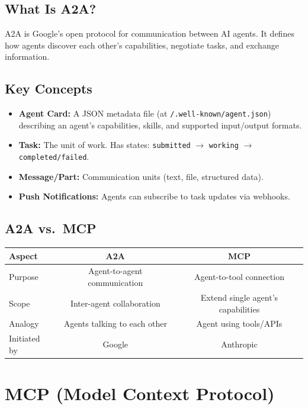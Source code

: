\documentclass[11pt,a4paper]{article}
\begin{document}
\subsection{What Is A2A?}
A2A is Google's open protocol for communication between AI agents. It defines how agents discover each other's capabilities, negotiate tasks, and exchange information.

\subsection{Key Concepts}
\begin{itemize}[nosep]
  \item \textbf{Agent Card:} A JSON metadata file (at \texttt{/.well-known/agent.json}) describing an agent's capabilities, skills, and supported input/output formats.
  \item \textbf{Task:} The unit of work. Has states: \texttt{submitted} $\to$ \texttt{working} $\to$ \texttt{completed/failed}.
  \item \textbf{Message/Part:} Communication units (text, file, structured data).
  \item \textbf{Push Notifications:} Agents can subscribe to task updates via webhooks.
\end{itemize}

\subsection{A2A vs.\ MCP}
\begin{center}
\begin{tabular}{lcc}
\toprule
\textbf{Aspect} & \textbf{A2A} & \textbf{MCP} \\
\midrule
Purpose & Agent-to-agent communication & Agent-to-tool connection \\
Scope & Inter-agent collaboration & Extend single agent's capabilities \\
Analogy & Agents talking to each other & Agent using tools/APIs \\
Initiated by & Google & Anthropic \\
\bottomrule
\end{tabular}
\end{center}

\section{MCP (Model Context Protocol)}
\end{document}
